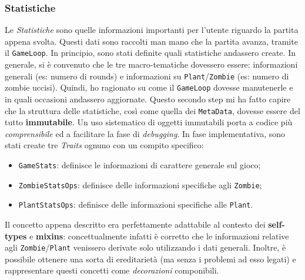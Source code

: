 \subsubsection{Statistiche}
Le \textit{Statistiche} sono quelle informazioni importanti per l'utente riguardo la partita appena svolta. Questi dati sono raccolti man mano che la partita avanza, tramite il \texttt{GameLoop}. In principio, sono stati definite quali statistiche andassero create. In generale, si è convenuto che le tre macro-tematiche dovessero essere: informazioni generali (es: numero di rounds) e informazioni su \texttt{Plant}/\texttt{Zombie} (es: numero di zombie uccisi). Quindi, ho ragionato su come il \texttt{GameLoop} dovesse manutenerle e in quali occasioni andassero aggiornate. Questo secondo step mi ha fatto capire che la struttura delle statistiche, così come quella dei \texttt{MetaData}, dovesse essere del tutto \textbf{immutabile}. Un uso sistematico di oggetti immutabili porta a codice più \textit{comprensibile} ed a facilitare la fase di \textit{debugging}. In fase implementativa, sono stati create tre \textit{Traits} ognuno con un compito specifico:
\begin{itemize}
    \item \texttt{GameStats}: definisce le informazioni di carattere generale sul gioco;
    \item \texttt{ZombieStatsOps}: definisce delle informazioni specifiche agli \texttt{Zombie};
    \item \texttt{PlantStatsOps}: definisce delle informazioni specifiche alle \texttt{Plant}.
\end{itemize}
Il concetto appena descritto era perfettamente adattabile al contesto dei \textbf{self-types} e \textbf{mixins}: concettualmente infatti è corretto che le informazioni relative agli \texttt{Zombie}/\texttt{Plant} venissero derivate solo utilizzando i dati generali. Inoltre, è possibile ottenere una sorta di ereditarietà (ma senza i problemi ad esso legati) e rappresentare questi concetti come \textit{decorazioni} componibili. 



